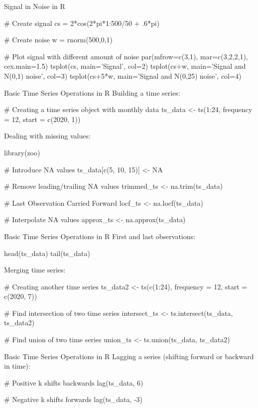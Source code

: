 \documentclass[ignorenonframetext,xcolor=x11names]{beamer}
\begin{document}
\begin{frame}[label=withcode,fragile]{Signal in Noise in R}
\begin{Rcode}
# Create signal
cs = 2*cos(2*pi*1:500/50 + .6*pi)

# Create noise
w = rnorm(500,0,1)

# Plot signal with different amount of noise
par(mfrow=c(3,1), mar=c(3,2,2,1), cex.main=1.5)
tsplot(cs, main='Signal', col=2)
tsplot(cs+w, main='Signal and N(0,1) noise', col=3)
tsplot(cs+5*w, main='Signal and N(0,25) noise', col=4)
\end{Rcode}
\end{frame}


\begin{frame}[label=withcode,fragile]{Basic Time Series Operations in R}
Building a time series:
\begin{Rcode}
# Creating a time series object with monthly data
ts_data <- ts(1:24, frequency = 12, start = c(2020, 1))
\end{Rcode}
Dealing with missing values:
\begin{Rcode}
library(zoo)

# Introduce NA values
ts_data[c(5, 10, 15)] <- NA

# Remove leading/trailing NA values
trimmed_ts <- na.trim(ts_data)

# Last Observation Carried Forward
locf_ts <- na.locf(ts_data)

# Interpolate NA values
approx_ts <- na.approx(ts_data)
\end{Rcode}
\end{frame}

\begin{frame}[label=withcode,fragile]{Basic Time Series Operations in R}
First and last observations:
\begin{Rcode}
head(ts_data)
tail(ts_data)
\end{Rcode}
Merging time series:
\begin{Rcode}
# Creating another time series
ts_data2 <- ts(c(1:24), frequency = 12, start = c(2020, 7))

# Find intersection of two time series
intersect_ts <- ts.intersect(ts_data, ts_data2)

# Find union of two time series
union_ts <- ts.union(ts_data, ts_data2)
\end{Rcode}
\end{frame}

\begin{frame}[label=withcode,fragile]{Basic Time Series Operations in R}
Lagging a series (shifting forward or backward in time):
\begin{Rcode}
# Positive k shifts backwards
lag(ts_data, 6)

# Negative k shifts forwards
lag(ts_data, -3)
\end{Rcode}
\end{frame}
\end{document}
